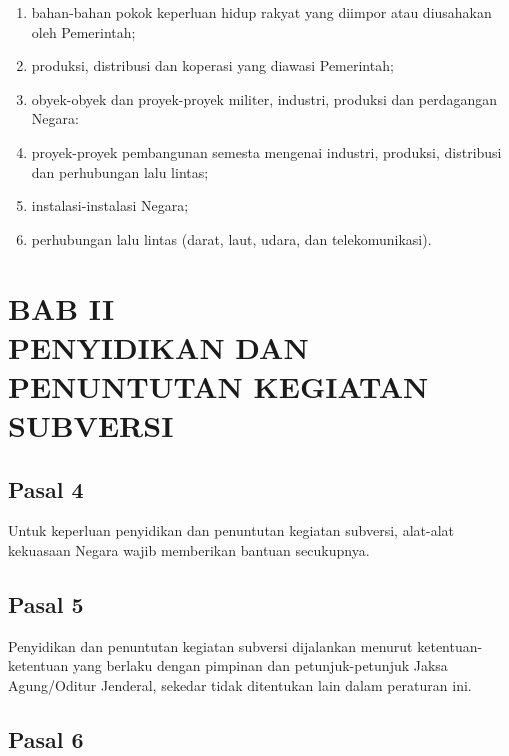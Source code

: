 \documentclass{article}
\begin{document}
\begin{enumerate}
\item bahan-bahan pokok keperluan hidup rakyat yang diimpor atau diusahakan oleh Pemerintah;
\item produksi, distribusi dan koperasi yang diawasi Pemerintah;
\item obyek-obyek dan proyek-proyek militer, industri, produksi dan perdagangan Negara:
\item proyek-proyek pembangunan semesta mengenai industri, produksi, distribusi dan perhubungan lalu
lintas;
\item instalasi-instalasi Negara;
\item perhubungan lalu lintas (darat, laut, udara, dan telekomunikasi).
\end{enumerate}

\section*{\centering{}BAB II\\PENYIDIKAN DAN PENUNTUTAN KEGIATAN SUBVERSI}

\subsection*{\centering{}Pasal 4}

Untuk keperluan penyidikan dan penuntutan kegiatan subversi, alat-alat kekuasaan Negara wajib
memberikan bantuan secukupnya.

\subsection*{\centering{}Pasal 5}

Penyidikan dan penuntutan kegiatan subversi dijalankan menurut ketentuan-ketentuan yang berlaku dengan
pimpinan dan petunjuk-petunjuk Jaksa Agung/Oditur Jenderal, sekedar tidak ditentukan lain dalam peraturan
ini.

\subsection*{\centering{}Pasal 6}
\end{document}
